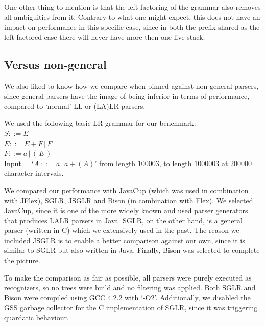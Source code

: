 \documentclass[a4paper,10pt]{article}
\begin{document}
One other thing to mention is that the left-factoring of the grammar also removes all ambiguities from it. Contrary to what one might expect, this does not have an impact on performance in this specific case, since in both the prefix-shared as the left-factored case there will never have more then one live stack.

\pagebreak
\subsection{Versus non-general}

We also liked to know how we compare when pinned against non-general parsers, since general parsers have the image of being inferior in terms of performance, compared to `normal' LL or (LA)LR parsers.

We used the following basic LR grammar for our benchmark:\\
$S ::= E$\\
$E ::= E + F\,|\,F$\\
$F ::= a\,|\,(\,E\,)$\\
Input = `$A\,::=\,a\,|\,a+(A)$' from length $100003$, to length $1000003$ at $200000$ character intervals.

We compared our performance with JavaCup (which was used in combination with JFlex), SGLR, JSGLR and Bison (in combination with Flex). We selected JavaCup, since it is one of the more widely known and used parser generators that produces LALR parsers in Java. SGLR, on the other hand, is a general parser (written in C) which we extensively used in the past. The reason we included JSGLR is to enable a better comparison against our own, since it is similar to SGLR but also written in Java. Finally, Bison was selected to complete the picture.

To make the comparison as fair as possible, all parsers were purely executed as recognizers, so no trees were build and no filtering was applied. Both SGLR and Bison were compiled using GCC 4.2.2 with `-O2'. Additionally, we disabled the GSS garbage collector for the C implementation of SGLR, since it was triggering quardatic behaviour.
\end{document}
